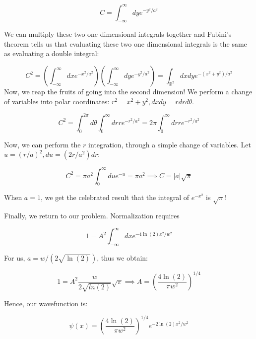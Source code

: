 \begin{example}
	\begin{equation}
		C = \int_{-\infty}^{\infty}dy e^{-y^2/a^2}
	\end{equation}
	
	We can multiply these two one dimensional integrals together and Fubini's theorem tells us that evaluating these two one dimensional integrals is the same as evaluating a double integral:
	
	\begin{equation}
		C^2 = \left(\int_{-\infty}^{\infty}dx e^{-x^2/a^2} \right) \left(\int_{-\infty}^{\infty} dy e^{-y^2/a^2}\right) = \int_{\mathbb{R}^2} dx dy e^{-(x^2 + y^2)/a^2}
	\end{equation}
	Now, we reap the fruits of going into the second dimension! We perform a change of variables into polar coordinates: $r^2 = x^2 + y^2, dxdy = rdrd\theta$. 
	
	\begin{equation}
		C^2 = \int_{0}^{2\pi}d\theta\int_{0}^{\infty}dr  re^{-r^2/a^2} = 2\pi \int_{0}^{\infty}dr  re^{-r^2/a^2} 
	\end{equation}
	
	Now, we can perform the $r$ integration, through a simple change of variables. Let $u = (r/a)^2, du = (2 r/a^2) dr$:
	
	\begin{equation}
		C^2 = \pi a^2\int_{0}^{\infty} du e^{-u} = \pi a^2 \implies C = |a|\sqrt{\pi}
	\end{equation}
	
	When $a = 1$, we get the celebrated result that the integral of $e^{-x^2}$ is $\sqrt{\pi}$! 
	
	Finally, we return to our problem. Normalization requires
	
	\begin{equation}
		1 = A^2 \int_{-\infty}^{\infty}dx e^{-4\ln(2) x^2/w^2}
	\end{equation}
	
	For us, $a = w/(2\sqrt{\ln(2)})$, thus we obtain:
	
	\begin{equation}
		1 = A^2 \frac{w}{2\sqrt{ln(2)}}\sqrt{\pi} \implies A = \left(\frac{4\ln(2)}{\pi w^2}\right)^{1/4}
	\end{equation}
	
	Hence, our wavefunction is:
	
	\begin{equation}
		\psi(x) =  \left(\frac{4\ln(2)}{\pi w^2}\right)^{1/4}e^{-2\ln(2) x^2/w^2}
	\end{equation}
	
\end{example}

